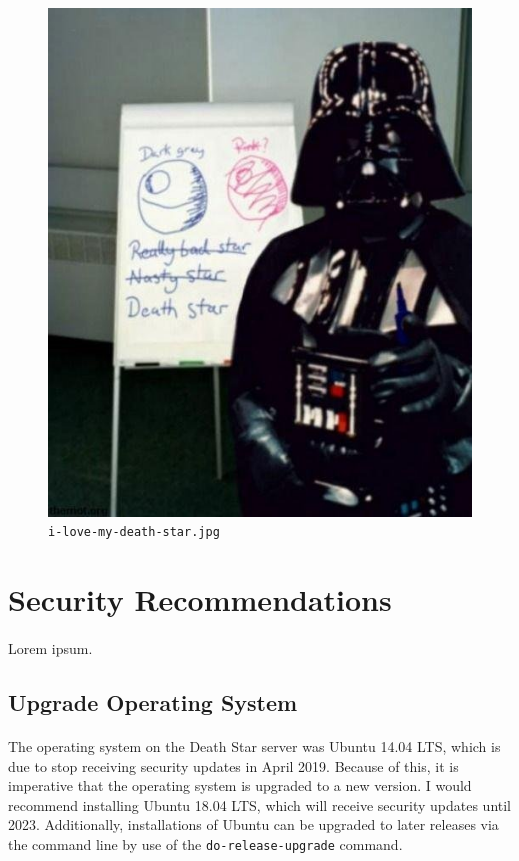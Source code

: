 \documentclass{article}
\begin{document}
\begin{figure}[H]
	\includegraphics[width=\linewidth]{resources/plans/i-love-my-death-star.jpg}
	\caption{\texttt{i-love-my-death-star.jpg}}
	\label{fig:i_love_my_death_star}
\end{figure}

\newpage

\section{Security Recommendations}
\label{sec:security_recommendations}
\paragraph{}
Lorem ipsum.

\subsection{Upgrade Operating System}
\label{subsec:upgrade_os}
\paragraph{}
The operating system on the Death Star server was Ubuntu 14.04 LTS, which is due to stop receiving security updates in April 2019.
Because of this, it is imperative that the operating system is upgraded to a new version.
I would recommend installing Ubuntu 18.04 LTS,  which will receive security updates until 2023.
Additionally, installations of Ubuntu can be upgraded to later releases via the command line by use of the \texttt{do-release-upgrade} command.
\end{document}
